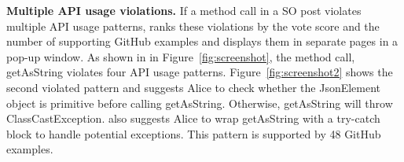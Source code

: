 {\bf Multiple API usage violations.} If a method call in a SO post violates multiple API usage patterns, {\tool} ranks these violations by the vote score and the number of supporting GitHub examples and displays them in separate pages in a pop-up window. As shown in  in Figure~\ref{fig:screenshot}, the method call, {\ttt getAsString} violates four API usage patterns. Figure~\ref{fig:screenshot2} shows the second violated pattern and suggests Alice to check whether the {\ttt JsonElement} object is primitive before calling {\ttt getAsString}. Otherwise, {\ttt getAsString} will throw {\ttt ClassCastException}. {\tool} also suggests Alice to wrap {\ttt getAsString} with a {\ttt try-catch} block to handle potential exceptions. This pattern is supported by 48 GitHub examples.





